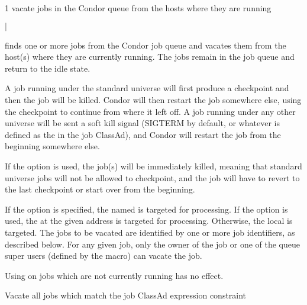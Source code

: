 \begin{ManPage}{\label{man-condor-vacate-job}}{1}
{vacate jobs in the Condor queue from the hosts where they are running}
\Synopsis {}
\ToolArgsBase

\ToolLocate
\ToolJobs
$|$  \Dots

\ToolLocate
\ToolAll


\Description

 finds one or more jobs from the Condor job queue
and vacates them from the host(s) where they are currently running.  
The jobs remain in the job queue and return to the idle state.

A job running under the standard universe will first produce a
checkpoint and then the job will be killed.
Condor will then restart the job somewhere else, using the checkpoint
to continue from where it left off.
A job running under any other universe will be sent a soft kill signal
(SIGTERM by default, or whatever is defined as the 
in the job ClassAd), and Condor will restart the job from the
beginning somewhere else. 

If the  option is used, the job(s) will be immediately killed,
meaning that standard universe jobs will not be allowed to checkpoint,
and the job will have to revert to the last checkpoint or start over
from the beginning.

If the  option is specified, the named  is
targeted for processing.  
If the  option is used, the  at the given
address is targeted for processing.  
Otherwise, the local  is targeted.
The jobs to be vacated are identified by one or more job identifiers, as
described below.
For any given job, only the owner of the job or one of the queue super users
(defined by the  macro) can vacate the job.

Using  on jobs which are not currently running has
no effect.

\begin{Options}
	\ToolArgsBaseDesc
	\ToolLocateDesc
	 {Vacate all jobs which match
	                the job ClassAd expression constraint}
\end{Options}


\end{ManPage}
